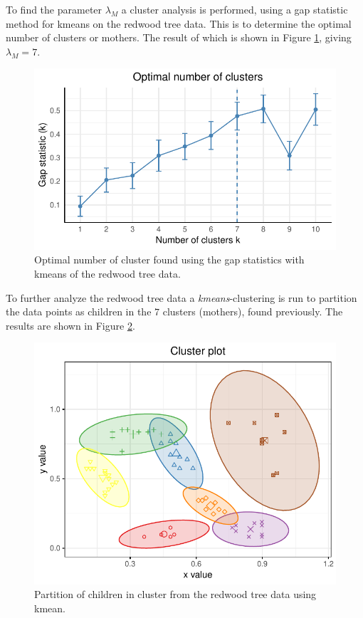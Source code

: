 To find the parameter $\lambda_M$ a cluster analysis is performed, using a gap statistic method for kmeans on the redwood tree data. This is to determine the optimal number of clusters or mothers. The result of which is shown in Figure \ref{fig:numb_clust}, giving $\lambda_M = 7$.

\begin{figure}
    \centering
    \includegraphics[scale=0.95]{figures/numb_clusters.pdf}
    \caption{Optimal number of cluster found using the gap statistics with kmeans of the redwood tree data.}
    \label{fig:numb_clust}
\end{figure}

To further analyze the redwood tree data a \textit{kmeans}-clustering is run to partition the data points as children in the $7$ clusters (mothers), found previously. The results are shown in Figure \ref{fig:cluster_part}. 

\begin{figure}
    \centering
    \includegraphics[scale=0.95]{figures/redwood_cluster_partitioning.pdf}
    \caption{Partition of children in cluster from the redwood tree data using kmean.}
    \label{fig:cluster_part}
\end{figure}

